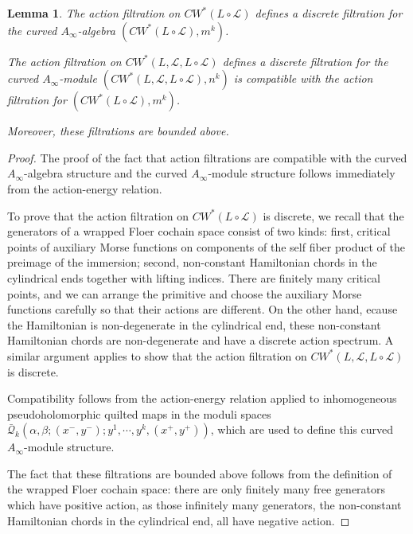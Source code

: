 \documentclass{amsart}
\newtheorem{lemma}[theorem]{Lemma}
\numberwithin{equation}{section}
\numberwithin{figure}{section}
\begin{document}
\begin{lemma}
	The action filtration on $CW^{*}(L \circ \mathcal{L})$ defines a discrete filtration for the curved $A_{\infty}$-algebra $(CW^{*}(L \circ \mathcal{L}), m^{k})$. \par
	The action filtration on $CW^{*}(L, \mathcal{L}, L \circ \mathcal{L})$ defines a discrete filtration for the curved $A_{\infty}$-module $(CW^{*}(L, \mathcal{L}, L \circ \mathcal{L}), n^{k})$ is compatible with the action filtration for $(CW^{*}(L \circ \mathcal{L}), m^{k})$. \par
	Moreover, these filtrations are bounded above. \par
\end{lemma}
\begin{proof}
	The proof of the fact that action filtrations are compatible with the curved $A_{\infty}$-algebra structure and the curved $A_{\infty}$-module structure follows immediately from the action-energy relation. \par
	To prove that the action filtration on  $CW^{*}(L \circ \mathcal{L})$ is discrete, we recall that the generators of a wrapped Floer cochain space consist of two kinds: first, critical points of auxiliary Morse functions on components of the self fiber product of the preimage of the immersion; second, non-constant Hamiltonian chords in the cylindrical ends together with lifting indices. There are finitely many critical points, and we can arrange the primitive and choose the auxiliary Morse functions carefully so that their actions are different. On the other hand, ecause the Hamiltonian is non-degenerate in the cylindrical end, these non-constant Hamiltonian chords are non-degenerate and have a discrete action spectrum. A similar argument applies to show that the action filtration on $CW^{*}(L, \mathcal{L}, L \circ \mathcal{L})$ is discrete. \par
	Compatibility follows from the action-energy relation applied to inhomogeneous pseudoholomorphic quilted maps in the moduli spaces $\bar{\mathcal{Q}}_{k}(\alpha, \beta; (x^{-}, y^{-}); y^{1}, \cdots, y^{k}, (x^{+}, y^{+}))$, which are used to define this curved $A_{\infty}$-module structure. \par
	The fact that these filtrations are bounded above follows from the definition of the wrapped Floer cochain space: there are only finitely many free generators which have positive action, as those infinitely many generators, the non-constant Hamiltonian chords in the cylindrical end, all have negative action. \par
\end{proof}
\end{document}
